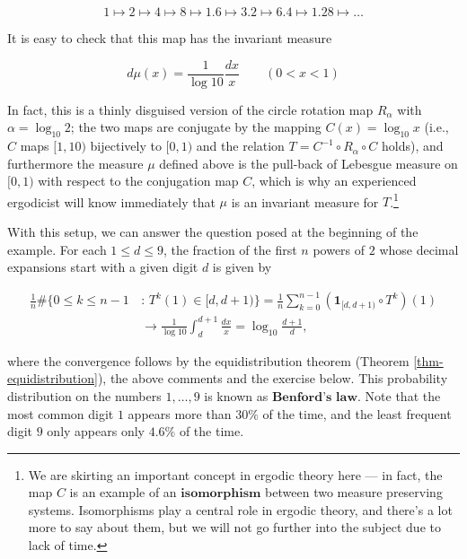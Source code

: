 \begin{enumerate}[label=\arabic*.]
\[
1 \mapsto 2 \mapsto 4 \mapsto 8 \mapsto 1.6 \mapsto 3.2 \mapsto 6.4 \mapsto 1.28 \mapsto \ldots
\]

\noindent It is easy to check that this map has the invariant
measure

\[
d\mu(x) = \frac{1}{\log 10} \frac{dx}{x} \qquad (0<x<1)
\]

\noindent In fact, this is a thinly disguised version of the
circle rotation map $R_\alpha$ with
$\alpha=\log_{10} 2$; the two maps are conjugate by
the mapping $C(x) = \log_{10} x$ (i.e., $C$ maps
$[1,10)$ bijectively to $[0,1)$ and the relation
$T = C^{-1} \circ R_\alpha\circ C$ holds), and
furthermore the measure $\mu$ defined above is the
pull-back of Lebesgue measure on $[0,1)$ with respect
to the conjugation map $C$, which is why an
experienced ergodicist will know immediately that
$\mu$ is an invariant measure for
$T$.\footnote{We are skirting an important concept in ergodic
theory here --- in fact, the map $C$ is an example of
an $\textbf{isomorphism}$ between two measure
preserving systems. Isomorphisms play a central role
in ergodic theory, and there's a lot more to say about
them, but we will not go further into the subject due
to lack of time.}

With this setup, we can answer the question posed at
the beginning of the example. For each $1\le d\le 9$,
the fraction of the first $n$ powers of $2$ whose
decimal expansions start with a given digit $d$ is
given by

\begin{align*}
\frac{1}{n} \#\{ 0\le k\le n-1\,&:\, T^k(1) \in [d,d+1) \} =
\frac{1}{n} \sum_{k=0}^{n-1} \left(\mathbf{1}_{[d,d+1)}\circ T^k\right)(1) \\ &\to \frac{1}{\log 10}\int_d^{d+1}\frac{dx}{x}
= \log_{10}\frac{d+1}{d},
\end{align*}

\noindent where the convergence follows by the equidistribution
theorem (Theorem \ref{thm-equidistribution}), the above
comments and the exercise below. This probability
distribution on the numbers $1,\ldots,9$ is known as
$\textbf{Benford's law}$. Note that the most common
digit $1$ appears more than $30\%$ of the time, and
the least frequent digit $9$ only appears only $4.6\%$
of the time.


\end{enumerate}
